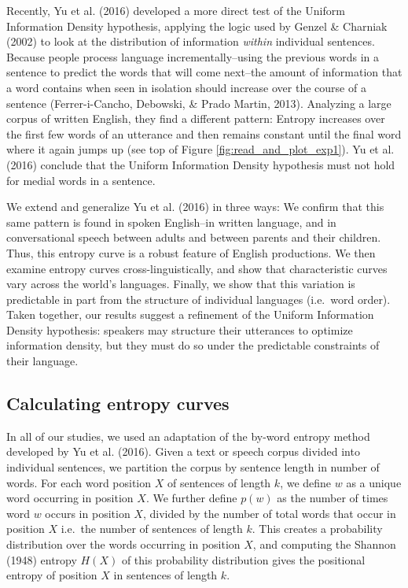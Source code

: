 \documentclass[10pt, letterpaper]{article}
\begin{document}
Recently, Yu et al. (2016) developed a more direct test of the Uniform
Information Density hypothesis, applying the logic used by Genzel \&
Charniak (2002) to look at the distribution of information \emph{within}
individual sentences. Because people process language
incrementally--using the previous words in a sentence to predict the
words that will come next--the amount of information that a word
contains when seen in isolation should increase over the course of a
sentence (Ferrer-i-Cancho, Debowski, \& Prado Martin, 2013). Analyzing a
large corpus of written English, they find a different pattern: Entropy
increases over the first few words of an utterance and then remains
constant until the final word where it again jumps up (see top of Figure
\ref{fig:read_and_plot_exp1}). Yu et al. (2016) conclude that the
Uniform Information Density hypothesis must not hold for medial words in
a sentence.

We extend and generalize Yu et al. (2016) in three ways: We confirm that
this same pattern is found in spoken English--in written language, and
in conversational speech between adults and between parents and their
children. Thus, this entropy curve is a robust feature of English
productions. We then examine entropy curves cross-linguistically, and
show that characteristic curves vary across the world's languages.
Finally, we show that this variation is predictable in part from the
structure of individual languages (i.e.~word order). Taken together, our
results suggest a refinement of the Uniform Information Density
hypothesis: speakers may structure their utterances to optimize
information density, but they must do so under the predictable
constraints of their language.

\hypertarget{calculating-entropy-curves}{%
\subsection{Calculating entropy
curves}\label{calculating-entropy-curves}}

In all of our studies, we used an adaptation of the by-word entropy
method developed by Yu et al. (2016). Given a text or speech corpus
divided into individual sentences, we partition the corpus by sentence
length in number of words. For each word position \(X\) of sentences of
length \(k\), we define \(w\) as a unique word occurring in position
\(X\). We further define \(p(w)\) as the number of times word \(w\)
occurs in position \(X\), divided by the number of total words that
occur in position \(X\) i.e.~the number of sentences of length \(k\).
This creates a probability distribution over the words occurring in
position \(X\), and computing the Shannon (1948) entropy \(H(X)\) of
this probability distribution gives the positional entropy of position
\(X\) in sentences of length \(k\).
\end{document}
